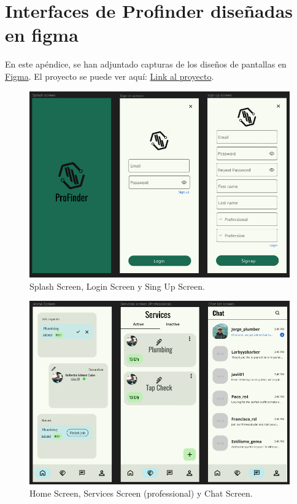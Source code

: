 \chapter{Interfaces de Profinder diseñadas en figma}
\label{Appendix:interfacesfigma}
En este apéndice, se han adjuntado capturas de los diseños de pantallas en \hyperlink{subsec:figma}{Figma}. El proyecto se puede ver aquí: \href{https://www.figma.com/file/RczHTTSY0EkrdOnrnHMPWb/Profinder?type=design&node-id=0%3A1&mode=design&t=BnrHPXS7PUtcqHPP-1}{Link al proyecto}.
\begin{figure}[h]
	\centering
	\includegraphics[width = 1\textwidth]{Imagenes/figma/figma1.png}
	\caption{Splash Screen, Login Screen y Sing Up Screen.}
	\label{fig:figma1}
\end{figure}
\begin{figure}[h]
	\centering
	\includegraphics[width = 1\textwidth]{Imagenes/figma/figma2.png}
	\caption{Home Screen, Services Screen (professional) y Chat Screen.}
	\label{fig:figma2}
\end{figure}
